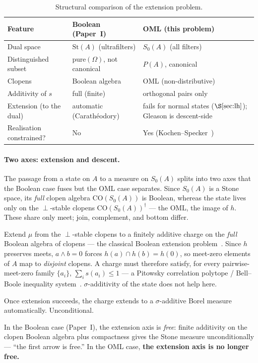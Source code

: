 \documentclass[11pt]{article}
\theoremstyle{definition}
\newcommand{\St}{\mathrm{St}}
\newcommand{\pure}{\mathrm{pure}}
\newcommand{\CO}{\mathrm{CO}}
\begin{document}
\begin{table}[ht]
\centering
\renewcommand{\arraystretch}{1.3}
\begin{tabular}{@{}l p{4.8cm} p{5.2cm}@{}}
\toprule
\textbf{Feature} & \textbf{Boolean (Paper~I)} & \textbf{OML (this problem)} \\
\midrule
Dual space
  & $\St(A)$ (ultrafilters)
  & $S_0(A)$ (all filters) \\
Distinguished subset
  & $\pure(\Omega)$, not canonical
  & $P(A)$, canonical \\
Clopens
  & Boolean algebra
  & OML (non-distributive) \\
Additivity of $s$
  & full (finite)
  & orthogonal pairs only \\
Extension (to the dual)
  & automatic (Carath\'{e}odory)
  & fails for normal states ($\S\ref{sec:lh}$); Gleason is descent-side \\
Realisation constrained?
  & No
  & Yes (Kochen--Specker~\cite{KochenSpecker1967}) \\
\bottomrule
\end{tabular}
\caption{Structural comparison of the extension problem.}
\label{tab:comparison}
\end{table}

\paragraph{Two axes: extension and descent.}
The passage from a state on $A$ to a measure on $S_0(A)$ splits into
two axes that the Boolean case fuses but the OML case separates.
Since $S_0(A)$ is a Stone space, its \emph{full} clopen algebra
$\CO(S_0(A))$ is Boolean, whereas the state lives only on the
$\perp$-stable clopens $\CO(S_0(A))^\dagger$ --- the OML, the image
of $h$.  These share only meet; join, complement, and bottom differ.
\begin{description}[style=nextline, font=\normalfont\bfseries,
    labelwidth=2.5cm, leftmargin=3cm]
  \item[Extension]
    Extend $\mu$ from the $\perp$-stable clopens to a finitely
    additive charge on the \emph{full} Boolean algebra of clopens
    --- the classical Boolean extension
    problem~\cite{HornTarski1948}.  Since $h$ preserves meets,
    $a \wedge b = 0$ forces $h(a) \cap h(b) = h(0)$, so meet-zero
    elements of $A$ map to \emph{disjoint} clopens.  A charge must
    therefore satisfy, for every pairwise-meet-zero family
    $\{a_i\}$, $\sum_i s(a_i) \leq 1$ --- a Pitowsky correlation
    polytope / Bell--Boole inequality
    system~\cite{Pitowsky1989}. $\sigma$-additivity of the state
    does not help here.
  \item[Compactness]
    Once extension succeeds, the charge extends to a
    $\sigma$-additive Borel measure automatically.  Unconditional.
\end{description}
In the Boolean case (Paper~I), the extension axis is \emph{free}:
finite additivity on the clopen Boolean algebra plus compactness
gives the Stone measure unconditionally --- ``the first arrow is
free.''  In the OML case, \textbf{the extension axis is no longer
free.}
\end{document}
